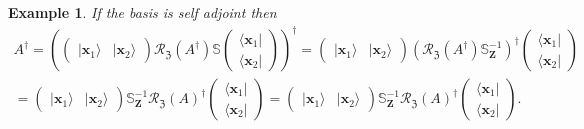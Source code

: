 \documentclass[aps, preprint]{revtex4}
\newtheorem{example}[theorem]{Example}
\begin{document}
\begin{example}
If the basis is self adjoint then
\begin{gather}A^{ \dag } =\left (\left (\begin{array}{cc}\vert \mathbf{x}_{1} \rangle  & \vert \mathbf{x}_{2} \rangle \end{array}\right ) \mathcal{R}_{\mathfrak{Z}} \left (A^{ \dag }\right ) \mathbb{S} \left (\begin{array}{c} \langle \mathbf{x}_{1}\vert  \\
 \langle \mathbf{x}_{2}\vert \end{array}\right )\right )^{ \dag } =\left (\begin{array}{cc}\vert \mathbf{x}_{1} \rangle  & \vert \mathbf{x}_{2} \rangle \end{array}\right ) \left (\mathcal{R}_{\mathfrak{Z}} \left (A^{ \dag }\right ) \mathbb{S}_{\mathbf{Z}}^{ -1}\right )^{ \dag } \left (\begin{array}{c} \langle \mathbf{x}_{1}\vert  \\
 \langle \mathbf{x}_{2}\vert \end{array}\right ) \\
 =\left (\begin{array}{cc}\vert \mathbf{x}_{1} \rangle  & \vert \mathbf{x}_{2} \rangle \end{array}\right ) \mathbb{S}_{\mathbf{Z}}^{ -1} \mathcal{R}_{\mathfrak{Z}} \left (A\right )^{ \dag } \left (\begin{array}{c} \langle \mathbf{x}_{1}\vert  \\
 \langle \mathbf{x}_{2}\vert \end{array}\right ) =\left (\begin{array}{cc}\vert \mathbf{x}_{1} \rangle  & \vert \mathbf{x}_{2} \rangle \end{array}\right ) \mathbb{S}_{\mathbf{Z}}^{ -1} \mathcal{R}_{\mathfrak{Z}} \left (A\right )^{ \dag } \left (\begin{array}{c} \langle \mathbf{x}_{1}\vert  \\
 \langle \mathbf{x}_{2}\vert \end{array}\right )\text{.}\end{gather}
\end{example}
\end{document}

